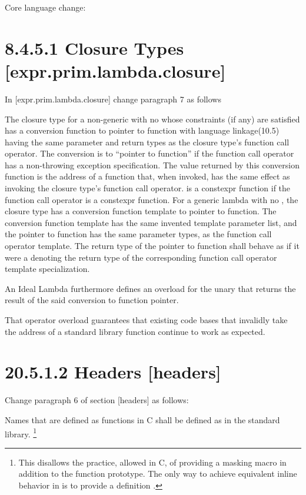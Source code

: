 \documentclass[ebook,11pt,article]{memoir}
\begin{document}
Core language change:
\section{8.4.5.1 Closure Types [expr.prim.lambda.closure]}

In [expr.prim.lambda.closure] change paragraph 7 as follows

\pnum
The closure type for a non-generic  with no
whose constraints (if any) are satisfied
has a conversion function to pointer to
function with \Cpp{} language linkage(10.5) %
having
the same parameter and return types as the closure type's function call operator.
The conversion is to ``pointer to  function''
if the function call operator
has a non-throwing exception specification.
The value returned by this conversion function
is the address of a function  that, when invoked,
has the same effect as invoking the closure type's function call operator.
 is a constexpr function
if the function call operator is a constexpr function.
For a generic lambda with no , the closure type has a
conversion function template to
pointer to function. The conversion function template has the same invented
template parameter list, and the pointer to function has the same
parameter types, as the function call operator template.  The return type of
the pointer to function shall behave as if it were a
 denoting the return type of the corresponding
function call operator template specialization.
\begin{addedblock}
An Ideal Lambda furthermore defines an overload for the unary  that returns the result of the said conversion to function pointer. 
\begin{note}
That operator overload guarantees that existing code bases that invalidly take the address of a standard library function continue to work as expected.
\end{note}
\end{addedblock}

\section{20.5.1.2 Headers [headers]}
Change paragraph 6 of section [headers] as follows:

Names that are defined as functions in C shall be defined as  in the
\Cpp{} standard library. \footnote{This disallows the practice, allowed in C, of
providing a masking macro in addition to the function prototype. The only way to
achieve equivalent inline behavior in \Cpp{} is to provide a definition .}
\end{document}
